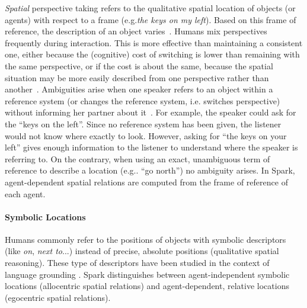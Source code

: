 \documentclass[preprint,3p,times]{elsarticle}
\newcommand{\ie}{i.e.\xspace}
\newcommand{\eg}{e.g.\xspace}
\begin{document}
\emph{Spatial} perspective taking refers to the qualitative spatial location of
objects (or agents) with respect to a frame (\eg \emph{the keys on my left}).
Based on this frame of reference, the description of an object
varies~\cite{Marin2008}. Humans mix perspectives frequently during interaction.
This is more effective than maintaining a consistent one, either because the
(cognitive) cost of switching is lower than remaining with the same
perspective, or if the cost is about the same, because the spatial situation
may be more easily described from one perspective rather than
another~\cite{Tversky1999}. Ambiguities arise when one speaker refers to an
object within a reference system (or changes the reference system, \ie switches
perspective) without informing her partner about it~\cite{Breazeal2006,
Ros2010}. For example, the speaker could ask for the ``keys on the left''.
Since no reference system has been given, the listener would not know where
exactly to look.  However, asking for ``the keys on your left'' gives enough
information to the listener to understand where the speaker is referring to. On
the contrary, when using an exact, unambiguous term of reference to describe a
location (\eg. ``go north'') no ambiguity arises.
In {\sc Spark}, agent-dependent spatial relations are computed from the frame of
reference of each agent.

\paragraph{Symbolic Locations}

Humans commonly refer to the positions of objects with symbolic descriptors
(like \emph{on}, \emph{next to}...) instead of precise, absolute positions
(qualitative spatial reasoning). These type of descriptors have been studied in the context of language grounding
\cite{O'Keefe1999,Matuszek2010,Regier2001,Kelleher2006,Blisard2005}.  {\sc
Spark} distinguishes between agent-independent symbolic locations (allocentric
spatial relations) and agent-dependent, relative locations (egocentric spatial
relations).
\end{document}
